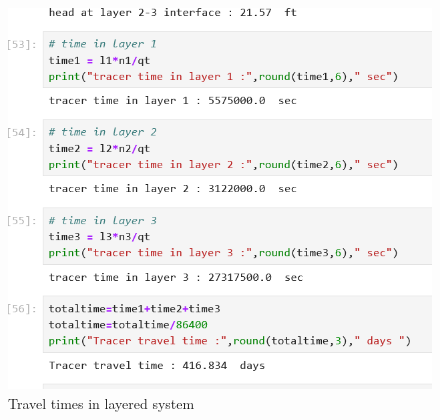 \documentclass[12pt]{article}
\begin{document}
\begin{enumerate}
\begin{figure}[h!] %
   \centering
   \includegraphics[width=5in]{traveltimes.png} 
   \caption{Travel times in layered system}
   \label{fig:traveltimes}
\end{figure}


\end{enumerate}
\end{document}
